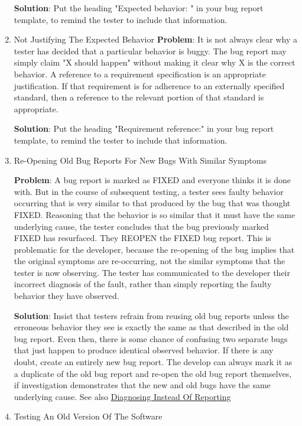 \documentclass{article}
\begin{document}
\begin{enumerate}
\textbf{Solution}: Put the heading "Expected behavior: " in your bug report
template, to remind the tester to include that information.

\item Not Justifying The Expected Behavior
\label{sec:orgheadline93}
\textbf{Problem}: It is not always clear why a tester has decided that a
particular behavior is buggy. The bug report may simply claim "X should
happen" without making it clear why X is the correct behavior. A
reference to a requirement specification is an appropriate
justification. If that requirement is for adherence to an externally
specified standard, then a reference to the relevant portion of that
standard is appropriate.

\textbf{Solution}: Put the heading "Requirement reference:" in your bug report
template, to remind the tester to include that information.

\item Re-Opening Old Bug Reports For New Bugs With Similar Symptoms
\label{sec:orgheadline95}

\textbf{Problem}: A bug report is marked as FIXED and everyone thinks it is
done with. But in the course of subsequent testing, a tester sees faulty
behavior occurring that is very similar to that produced by the bug that
was thought FIXED. Reasoning that the behavior is so similar that it
must have the same underlying cause, the tester concludes that the bug
previously marked FIXED has resurfaced. They REOPEN the FIXED bug
report. This is problematic for the developer, because the re-opening of
the bug implies that the original symptoms are re-occurring, not the
similar symptoms that the tester is now observing. The tester has
communicated to the developer their incorrect diagnosis of the fault,
rather than simply reporting the faulty behavior they have observed.

\textbf{Solution}: Insist that testers refrain from reusing old bug reports
unless the erroneous behavior they see is exactly the same as that
described in the old bug report. Even then, there is some chance of
confusing two separate bugs that just happen to produce identical
observed behavior. If there is any doubt, create an entirely new bug
report. The develop can always mark it as a duplicate of the old bug
report and re-open the old bug report themselves, if investigation
demonstrates that the new and old bugs have the same underlying cause.
See also \hyperref[sec:orgheadline94]{Diagnosing Instead Of Reporting}

\item Testing An Old Version Of The Software
\label{sec:orgheadline96}


\end{enumerate}
\end{document}
